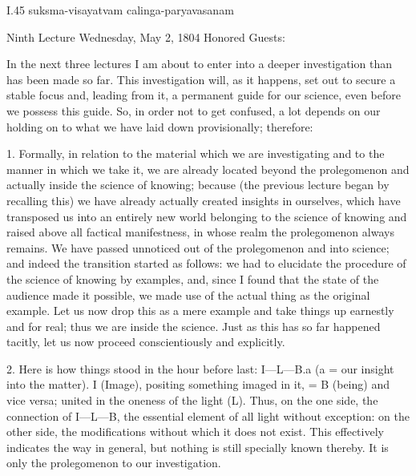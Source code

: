 I.45
suksma-visayatvam calinga-paryavasanam

Ninth Lecture
Wednesday, May 2, 1804
Honored Guests:

In the next three lectures I am about to enter
into a deeper investigation than has been made so far.
This investigation will, as it happens,
set out to secure a stable focus
and, leading from it, a permanent guide for our science,
even before we possess this guide.
So, in order not to get confused, a lot depends
on our holding on to what we have laid down provisionally;
therefore:

1. Formally, in relation to the material
which we are investigating
and to the manner in which we take it,
we are already located beyond the prolegomenon
and actually inside the science of knowing;
because (the previous lecture began by recalling this)
we have already actually created insights in ourselves,
which have transposed us into an entirely new world
belonging to the science of knowing
and raised above all factical manifestness,
in whose realm the prolegomenon always remains.
We have passed unnoticed out of
the prolegomenon and into science;
and indeed the transition started as follows:
we had to elucidate the procedure of
the science of knowing by examples,
and, since I found that the state of
the audience made it possible,
we made use of the actual thing
as the original example.
Let us now drop this as a mere example
and take things up earnestly and for real;
thus we are inside the science.
Just as this has so far happened tacitly,
let us now proceed conscientiously and explicitly.

2. Here is how things stood in the hour before last:
I—L—B.a (a = our insight into the matter).
I (Image), positing something imaged in it,
= B (being) and vice versa;
united in the oneness of the light (L).
Thus, on the one side,
the connection of I—L—B,
the essential element of all light without exception:
on the other side, the modifications
without which it does not exist.
This effectively indicates the way in general,
but nothing is still specially known thereby.
It is only the prolegomenon to our investigation.

